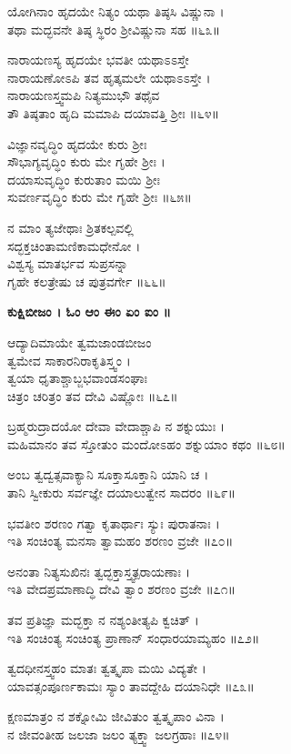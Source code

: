 	ಯೋಗಿನಾಂ ಹೃದಯೇ ನಿತ್ಯಂ ಯಥಾ ತಿಷ್ಠಸಿ ವಿಷ್ಣುನಾ ।\\
	ತಥಾ ಮದ್ಭವನೇ ತಿಷ್ಠ ಸ್ಥಿರಂ ಶ್ರೀವಿಷ್ಣುನಾ ಸಹ ॥೬೩॥

ನಾರಾಯಣಸ್ಯ ಹೃದಯೇ ಭವತೀ ಯಥಾಽಽಸ್ತೇ\\ ನಾರಾಯಣೋಽಪಿ ತವ ಹೃತ್ಕಮಲೇ ಯಥಾಽಽಸ್ತೇ ।\\
ನಾರಾಯಣಸ್ತ್ವಮಪಿ ನಿತ್ಯಮುಭೌ ತಥೈವ \\ತೌ ತಿಷ್ಠತಾಂ ಹೃದಿ ಮಮಾಪಿ ದಯಾವತ್ತಿ ಶ್ರೀಃ ॥೬೪॥

	ವಿಜ್ಞಾನವೃದ್ಧಿಂ ಹೃದಯೇ ಕುರು ಶ್ರೀಃ \\ಸೌಭಾಗ್ಯವೃದ್ಧಿಂ ಕುರು ಮೇ ಗೃಹೇ ಶ್ರೀಃ ।\\
	ದಯಾಸುವೃದ್ಧಿಂ ಕುರುತಾಂ ಮಯಿ ಶ್ರೀಃ \\ಸುವರ್ಣವೃದ್ಧಿಂ ಕುರು ಮೇ ಗೃಹೇ ಶ್ರೀಃ ॥೬೫॥

ನ ಮಾಂ ತ್ಯಜೇಥಾಃ ಶ್ರಿತಕಲ್ಪವಲ್ಲಿ \\ಸದ್ಭಕ್ತಚಿಂತಾಮಣಿಕಾಮಧೇನೋ ।\\
ವಿಶ್ವಸ್ಯ ಮಾತರ್ಭವ ಸುಪ್ರಸನ್ನಾ \\ಗೃಹೇ ಕಲತ್ರೇಷು ಚ ಪುತ್ರವರ್ಗೇ ॥೬೬॥

{\bfseries ಕುಕ್ಷಿಬೀಜಂ । ಓಂ ಆಂ ಈಂ ಏಂ ಐಂ ॥}

	ಆದ್ಯಾದಿಮಾಯೇ ತ್ವಮಜಾಂಡಬೀಜಂ\\ ತ್ವಮೇವ ಸಾಕಾರನಿರಾಕೃತಿಸ್ತ್ವಂ ।\\
	ತ್ವಯಾ ಧೃತಾಶ್ಚಾಬ್ಜಭವಾಂಡಸಂಘಾಃ\\ಚಿತ್ರಂ ಚರಿತ್ರಂ ತವ ದೇವಿ ವಿಷ್ಣೋಃ ॥೬೭॥

ಬ್ರಹ್ಮರುದ್ರಾದಯೋ ದೇವಾ ವೇದಾಶ್ಚಾಪಿ ನ ಶಕ್ನುಯುಃ ।\\
ಮಹಿಮಾನಂ ತವ ಸ್ತೋತುಂ ಮಂದೋಽಹಂ ಶಕ್ನುಯಾಂ ಕಥಂ ॥೬೮॥

	ಅಂಬ ತ್ವದ್ವತ್ಸವಾಕ್ಯಾನಿ ಸೂಕ್ತಾಸೂಕ್ತಾನಿ ಯಾನಿ ಚ ।\\
	ತಾನಿ ಸ್ವೀಕುರು ಸರ್ವಜ್ಞೇ ದಯಾಲುತ್ವೇನ ಸಾದರಂ ॥೬೯॥

ಭವತೀಂ ಶರಣಂ ಗತ್ವಾ ಕೃತಾರ್ಥಾಃ ಸ್ಯುಃ ಪುರಾತನಾಃ ।\\
ಇತಿ ಸಂಚಿಂತ್ಯ ಮನಸಾ ತ್ವಾಮಹಂ ಶರಣಂ ವ್ರಜೇ ॥೭೦॥

	ಅನಂತಾ ನಿತ್ಯಸುಖಿನಃ ತ್ವದ್ಭಕ್ತಾಸ್ತ್ವತ್ಪರಾಯಣಾಃ ।\\
	ಇತಿ ವೇದಪ್ರಮಾಣಾದ್ಧಿ ದೇವಿ ತ್ವಾಂ ಶರಣಂ ವ್ರಜೇ ॥೭೧॥

ತವ ಪ್ರತಿಜ್ಞಾ ಮದ್ಭಕ್ತಾ ನ ನಶ್ಯಂತೀತ್ಯಪಿ ಕ್ವಚಿತ್ ।\\
ಇತಿ ಸಂಚಿಂತ್ಯ ಸಂಚಿಂತ್ಯ ಪ್ರಾಣಾನ್ ಸಂಧಾರಯಾಮ್ಯಹಂ ॥೭೨॥

	ತ್ವದಧೀನಸ್ತ್ವಹಂ ಮಾತಃ ತ್ವತ್ಕೃಪಾ ಮಯಿ ವಿದ್ಯತೇ ।\\
	ಯಾವತ್ಸಂಪೂರ್ಣಕಾಮಃ ಸ್ಯಾಂ ತಾವದ್ದೇಹಿ ದಯಾನಿಧೇ ॥೭೩॥

ಕ್ಷಣಮಾತ್ರಂ ನ ಶಕ್ನೋಮಿ ಜೀವಿತುಂ ತ್ವತ್ಕೃಪಾಂ ವಿನಾ ।\\
ನ ಜೀವಂತೀಹ ಜಲಜಾ ಜಲಂ ತ್ಯಕ್ತ್ವಾ ಜಲಗ್ರಹಾಃ ॥೭೪॥


